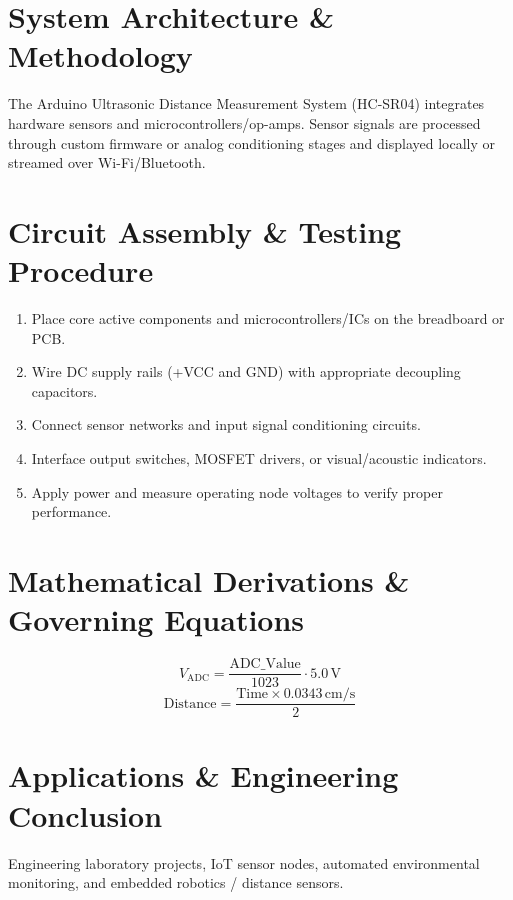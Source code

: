 \documentclass[11pt,a4paper]{article}
\begin{document}
\section{System Architecture \& Methodology}
The Arduino Ultrasonic Distance Measurement System (HC-SR04) integrates hardware sensors and microcontrollers/op-amps. Sensor signals are processed through custom firmware or analog conditioning stages and displayed locally or streamed over Wi-Fi/Bluetooth.

\section{Circuit Assembly \& Testing Procedure}
\begin{enumerate}
    \item Place core active components and microcontrollers/ICs on the breadboard or PCB.
    \item Wire DC supply rails (+VCC and GND) with appropriate decoupling capacitors.
    \item Connect sensor networks and input signal conditioning circuits.
    \item Interface output switches, MOSFET drivers, or visual/acoustic indicators.
    \item Apply power and measure operating node voltages to verify proper performance.
\end{enumerate}

\section{Mathematical Derivations \& Governing Equations}
\begin{equation}
V_{\text{ADC}} = \frac{\text{ADC\_Value}}{1023} \cdot 5.0\,\text{V}
\end{equation}
\begin{equation}
\text{Distance} = \frac{\text{Time} \times 0.0343\,\text{cm/s}}{2}
\end{equation}

\section{Applications \& Engineering Conclusion}
Engineering laboratory projects, IoT sensor nodes, automated environmental monitoring, and embedded robotics / distance sensors.
\end{document}
